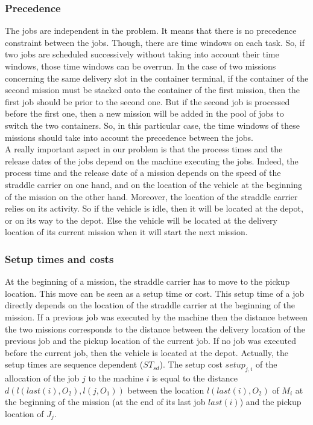 \documentclass[a4paper,10pt]{article}
\begin{document}
\subsubsection{Precedence}
The jobs are independent in the problem. It means that there is no precedence constraint between the jobs. Though, there are time windows on each task. So, if two jobs are scheduled successively without taking into account their time windows, those time windows can be overrun. In the case of two missions concerning the same delivery slot in the container terminal, if the container of the second mission must be stacked onto the container of the first mission, then the first job should be prior to the second one. But if the second job is processed before the first one, then a new mission will be added in the pool of jobs to switch the two containers. So, in this particular case, the time windows of these missions should take into account the precedence between the jobs.\\

A really important aspect in our problem is that the process times and the release dates of the jobs depend on the machine executing the jobs. Indeed, the process time and the release date of a mission depends on the speed of the straddle carrier on one hand, and on the location of the vehicle at the beginning of the mission on the other hand. Moreover, the location of the straddle carrier relies on its activity. So if the vehicle is idle, then it will be located at the depot, or on its way to the depot. Else the vehicle will be located at the delivery location of its current mission when it will start the next mission.

\subsubsection{Setup times and costs}

At the beginning of a mission, the straddle carrier has to move to the pickup location. This move can be seen as a setup time or cost. This setup time of a job directly depends on the location of the straddle carrier at the beginning of the mission. If a previous job was executed by the machine then the distance between the two missions corresponds to the distance between the delivery location of the previous job and the pickup location of the current job. If no job was executed before the current job, then the vehicle is located at the depot. Actually, the setup times are sequence dependent ($ST_{sd}$).
The setup cost $setup_{j, i}$ of the allocation of the job $j$ to the machine $i$ is equal to the distance $d(l(last(i),O_2),l(j,O_1))$ between the location $l(last(i),O_2)$ of $M_i$ at the beginning of the mission (at the end of its last job $last(i)$) and the pickup location of $J_j$.
\end{document}
